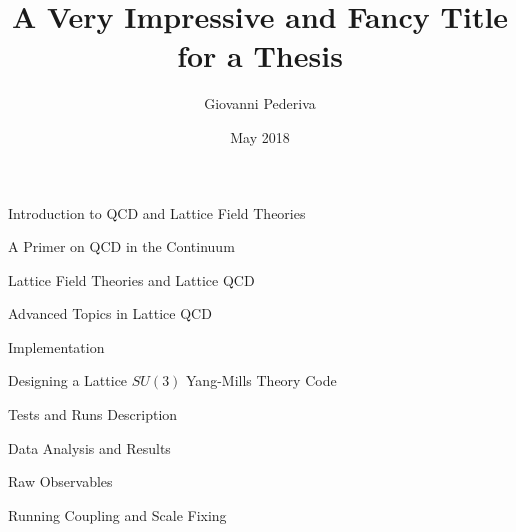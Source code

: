 \documentclass[twoside,english, a4paper, 11pt]{shared/uiofysmaster}
\author{Giovanni Pederiva}
\title{\bf{A Very Impressive and Fancy Title for a Thesis}}
\date{May 2018}
\begin{document}


\maketitle
\clearpage

\tableofcontents
\clearpage

\begin{abstract}
	
\end{abstract}

\begin{part}{Introduction to QCD and Lattice Field Theories}
	\label{part:intro}
	\begin{chapter}{A Primer on QCD in the Continuum}
		\label{chap:qcd_intro}
  		
	\end{chapter}

	\begin{chapter}{Lattice Field Theories and Lattice QCD}
		\label{chap:lattice_intro}
	  	
	\end{chapter}

	\begin{chapter}{Advanced Topics in Lattice QCD}
		\label{chap:grad_intro}
	  	
	\end{chapter}

\end{part}


\begin{part}{Implementation}
	\begin{chapter}{Designing a Lattice $SU(3)$ Yang-Mills Theory Code}
  		\label{chap:code_design}
  		
	\end{chapter}

	\begin{chapter}{Tests and Runs Description}
		\label{chap:test_runs}
		
  \end{chapter}
\end{part}


\begin{part}{Data Analysis and Results}
	\label{part:results}
	\begin{chapter}{Raw Observables}
  		\label{chap:obs_results}
  		
	\end{chapter}

	\begin{chapter}{Running Coupling and Scale Fixing}
		\label{chap:advance_results}
		
  	\end{chapter}
\end{part}
\end{document}
